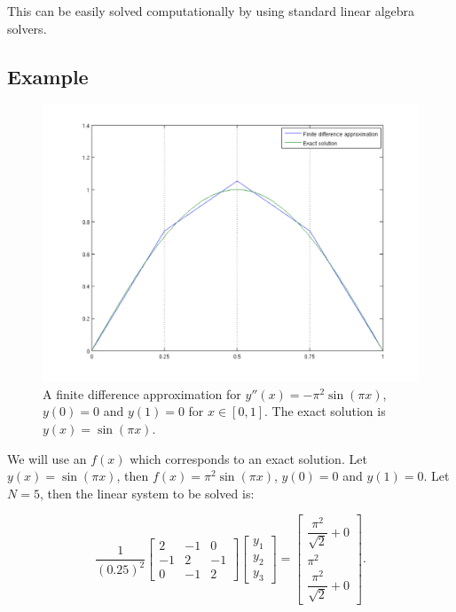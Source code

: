 This can be easily solved computationally by using standard linear algebra solvers.


\subsection{Example}

\begin{figure}[!ht]
  \includegraphics[width=1\textwidth]{./images/finitediffexample}
  \caption{A finite difference approximation for $y''(x)=-\pi^{2}\sin(\pi x)$,
    $y(0)=0$ and $y(1)=0$ for $x\in[0,1]$. The exact solution is $y(x)=\sin(\pi x)$.}
  \label{fig:A-finite-difference-example}
\end{figure}

We will use an $f(x)$ which corresponds to an exact solution. Let
$y(x)=\sin(\pi x)$, then $f(x)=\pi^{2}\sin(\pi x)$, $y(0)=0$ and
$y(1)=0$. Let $N=5$, then the linear system to be solved is:

\begin{equation*}
  \dfrac{1}{(0.25)^{2}}\left[
    \begin{array}{ccc}
      2 & -1 & 0\\
      -1 & 2 & -1\\
      0 & -1 & 2
    \end{array}
  \right]\left[
    \begin{array}{c}
      y_{1}\\ y_{2}\\ y_{3}
    \end{array}
  \right] = \left[
    \begin{array}{c}
      \dfrac{\pi^{2}}{\sqrt{2}}+0\\
      \pi^{2}\\
      \dfrac{\pi^{2}}{\sqrt{2}}+0
    \end{array}
  \right].
\end{equation*}

